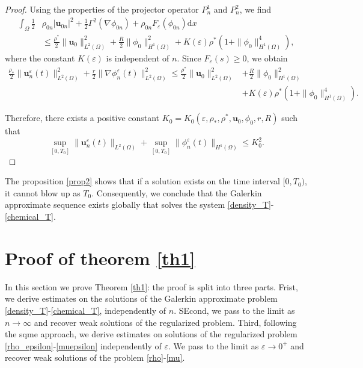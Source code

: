 \documentclass[11pt]{article}
\def\bfu{\mathbf{u}}
\def\Ga{\Gamma}
\begin{document}
\begin{proof}
Using the properties of the projector operator $P_n^1$ and $P_n^2$, we find
$$
\begin{aligned}
\int_{\Omega} \frac{1}{2} &\rho_{0 n}\left|\bfu_{0 n}\right|^2  +\frac{1}{2}\Ga^2\left(\nabla \phi_{0 n}\right)+\rho_{0 n} F_{\varepsilon}\left(\phi_{0 n}\right) \mathrm{d} x \\& \leq \frac{\rho^*}{2}\|\bfu_0\|_{L^2(\Omega)}^2+\frac{R}{2}\|\phi_0\|_{H^1(\Omega)}^2+K({\varepsilon}) \rho^*\left(1+\|\phi_0\|_{H^1(\Omega)}^4\right),
\end{aligned}
$$
where the constant $K({\varepsilon}) $ is independent of $n$. Since $F_{\varepsilon}(s) \geq 0$, we obtain
$$
\begin{aligned}
\frac{\rho_*}{2}\|\bfu_n^{\varepsilon}(t)\|_{L^2(\Omega)}^2 +\frac{r}{2}\|\nabla \phi_n^{\varepsilon}(t)\|_{L^2(\Omega)}^2 \leq \frac{\rho^*}{2}\|\bfu_0\|_{L^2(\Omega)}^2&+\frac{R}{2}\|\phi_0\|_{H^1(\Omega)}^2\\
&+K({\varepsilon}) \rho^*\left(1+\|\phi_0\|_{H^1(\Omega)}^4\right).
\end{aligned}
$$

Therefore, there exists a positive constant $K_0=K_0\left({\varepsilon},\rho_*, \rho^*, \bfu_0, \phi_0,r,R\right)$ such that
$$
\sup _{[0 ,T_0]}\|\bfu_n^{\varepsilon}(t)\|_{L^2(\Omega)}+\sup_{[0 ,T_0]}\|\phi_n^{\varepsilon}(t)\|_{H^1(\Omega)} \leq K_0^2.
$$
\end{proof}
The proposition \ref{prop2} shows that if a solution exists on the time interval $[0,T_0)$, it cannot blow up as $T_0$. Consequently, we conclude that the Galerkin approximate sequence exists globally that solves the system \eqref{density_T}-\eqref{chemical_T}.



\section{Proof of theorem \ref{th1}}\label{Global existence}
In this section we prove Theorem \ref{th1}: the proof is split into three parts. Frist, we derive
estimates on the solutions of the Galerkin approximate problem \eqref{density_T}-\eqref{chemical_T}, independently of $n$. SEcond, we pass to the limit as $n\rightarrow \infty$ and recover weak solutions of the regularized problem. Third, following the sqme approach, we derive estimates on solutions of the regularized problem \eqref{rho_epsilon}-\eqref{muepsilon} independently of $\varepsilon$. We
pass to the limit as $\varepsilon\rightarrow 0^{+}$ and recover weak solutions of the problem \eqref{rho}-\eqref{mu}.
\end{document}
